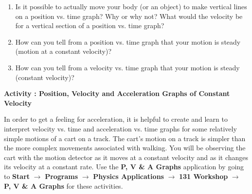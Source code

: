 \begin{enumerate}
\item Is it possible to actually move your body (or an object) to make vertical
lines on a position vs. time graph? Why or why not? What would the velocity
be for a vertical section of a position vs. time graph? 
\vspace{10mm}

\item How can you tell from a position vs. time graph that your motion is steady
(motion at a constant velocity)? 
\vspace{10mm}

\item How can you tell from a velocity vs. time graph that your motion is steady
(constant velocity)? 
\vspace{10mm}

\end{enumerate}

\newpage

\textbf{Activity : Position, Velocity and Acceleration Graphs of Constant Velocity}

In order to get a feeling for acceleration, it is helpful to create and learn
to interpret velocity vs. time and acceleration vs. time graphs for some relatively
simple motions of a cart on a track. 
The cart's motion on a track is simpler than the more complex movements associated with walking.
You will be observing the cart with the
motion detector as it moves at a constant velocity and as it changes its velocity
at a constant rate. Use the \textbf{P, V \& A Graphs} application by going to
\textbf{Start} $\rightarrow$ \textbf{Programs} $\rightarrow$ \textbf{Physics Applications} 
$\rightarrow$ \textbf{131 Workshop} $\rightarrow$ \textbf{P, V \& A Graphs} for these activities.

